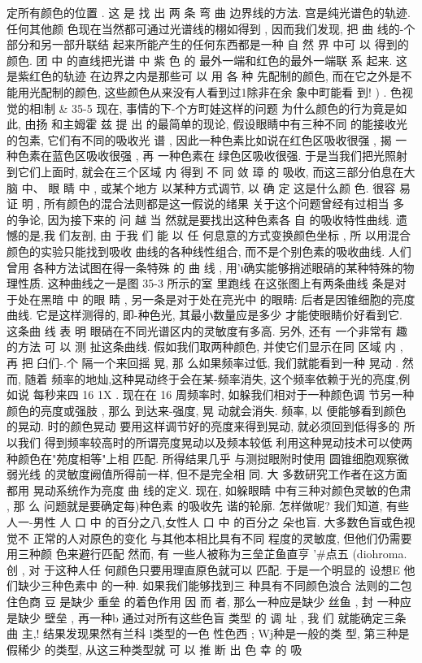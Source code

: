 \documentclass[11pt,oneside]{book}
\begin{document}
\begin{common-format}
{定所有颜色的位置 . 这 是 找 出 两 条 弯 曲 边界线的方法. 宫是纯光谱色的轨迹. 任何其他颜
色现在当然都可通过光谱线的栩如得到 , 因而我们发现, 把 曲 线的-个部分和另一部升联结
起来所能产生的任何东西都是一种 自 然 界 中可 以 得到的颜色. 团 中 的直线把光谱 中 紫 色 的
最外一端和红色的最外一端联 系 起来. 这是紫红色的轨迹
在边界之内是那些可 以 用 各 种
先配制的颜色, 而在它之外是不能用光配制的颜色, 这些颜色从来没有人看到过1除非在余
象中町能看 到! ) .
色视觉的相l制
& 35-5
现在, 事情的下-个方町娃这样的问题
为什么颜色的行为竟是如此, 由扬 和主姆霍
兹 提 出 的最简单的现论, 假设眼睛中有三种不同 的能接收光的包素, 它们有不同的吸收光
谱 , 因此一种色素比如说在红色区吸收很强 , 揭 一种色素在蓝色区吸收很强 , 再 一种色素在
绿色区吸收很强.
于是当我们把光照射到它们上面时, 就会在三个区域 内 得到 不 同 敛 璋 的
吸收, 而这三部分伯息在大脑 中、 眼 睛 中 , 或某个地方 以某种方式调节, 以 确 定 这是什么颜
色. 很容 易 证 明 , 所有颜色的混合法则都是这一假说的绪果
关于这个问题曾经有过相当
多 的争论, 因为接下来的 问 越 当 然就是要找出这种色素各 自 的吸收特性曲线. 遗憾的是,我
们友剖, 由 于我 们 能 以 任 何息意的方式变换颜色坐标 , 所 以用混合颜色的实验只能找到吸收
曲线的各种线性组合, 而不是个别色素的吸收曲线.
人们曾用 各种方法试图在得一条特殊
的 曲 线 , 用'ι确实能够捎述眼硝的某种特殊的物理性质. 这种曲线之一是图 35-3 所示的室
里跑线 在这张图上有两条曲线
条是对于处在黑暗 中 的眼 睛 , 另一条是对于处在亮光中
的眼睛: 后者是因锥细胞的亮度曲线. 它是这样测得的, 即-种色光, 其最小数量应是多少
才能使眼睛价好看到它. 这条曲 线 表 明 眼硝在不同光谱区内的灵敏度有多高. 另外, 还有
一个非常有 趣的方法 可 以 测 扯这条曲线.
假如我们取两种颜色, 并使它们显示在同
区域
内 , 再 把 臼们-.个 隔一个来回摇 晃, 那 么如果频率过低, 我们就能看到一种 晃动 . 然而, 随着
频率的地灿,这种晃动终于会在某-频率消失, 这个频率依赖于光的亮度,例如说 每秒来四
16 1X . 现在在 16 周频率时, 如躲我们相对于一种颜色调 节另一种颜色的亮度或强肢 , 那么
到达来-强度, 晃 动就会消失.
频率, 以 便能够看到颜色的晃动.
时的颜色晃动
要用这样调节好的亮度来得到晃动, 就必须回到低得多的
所 以我们 得到频率较高时的所谓亮度晃动以及频本较低
利用这种晃动技术可以使两种颜色在"苑度相等"上相 匹配. 所得结果几乎
与测挝眼附时使用 圆锥细胞观察微弱光线 的灵敏度阙值所得前一样, 但不是完全相 同.
大
多数研究工作者在这方面都用 晃动系统作为亮度 曲 线的定义.
现在, 如躲眼睛 中有三种对颜色灵敏的色肃 , 那 么 问题就是要确定每)种色素 的吸收先
谐的轮廓. 怎样做呢? 我们知道, 有些人一-男性 人 口 中 的百分之八,女性人 口 中 的百分之
朵也盲. 大多数色盲或色视觉不 正常的人对原色的变化 与其他本相比具有不同
程度的灵敏度, 但他们仍需要用三种颜 色来避行匹配 然而, 有 一些人被称为三垒芷鱼直亨
'#点五
(diohroma.创 , 对 于这种人任 何颜色只要用理直原色就可以 匹配.
于是一个明显的 设想E
他们缺少三种色素中 的一种. 如果我们能够找到三 种具有不同颜色浪合 法则的二包住色商
豆 是缺少 重垒 的着色作用 因 而
者, 那么一种应是缺少 丝鱼 , 封 一种应是缺少 壁垒 , 再一种b
通过对所有这些色盲 类型 的 调 址 , 我 们 就能确定三条曲 主,! 结果发现果然有兰科 l类型的一色
性色西 ; Wj种是一般的类 型, 第三种是假稀少 的类型, 从这三种类型就 可 以 推 断 出 色 幸 的 吸


}
\end{common-format}
\end{document}
